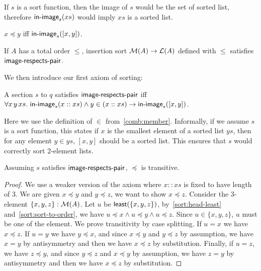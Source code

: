 If $s$ is a sort function, then the image of $s$ would be the set of sorted list, therefore
$\operatorname{\mathsf{in-image}}_s(xs)$ would imply $xs$ is a sorted list.

\begin{proposition}\label{sort:sort-to-order}
    $x \preccurlyeq y$ iff $\operatorname{\mathsf{in-image}}_s([x, y])$.
\end{proposition}

\begin{proposition}
    If $A$ has a total order $\leq$, insertion sort $\mathcal{M}(A) \to \mathcal{L}(A)$ defined with $\leq$
    satisfies $\operatorname{\mathsf{image-respects-pair}}$.
\end{proposition}

\noindent
We then introduce our first axiom of sorting:
\begin{definition}\label{sort:head-least}
    A section $s$ to $q$ satisfies $\operatorname{\mathsf{image-respects-pair}}$ iff
    $\forall x\, y\, xs.\, \operatorname{\mathsf{in-image}}_s(x :: xs) \land y \in (x :: xs) \to \operatorname{\mathsf{in-image}}_s([x,y])$.
\end{definition}
Here we use the definition of $\in$ from~\cref{comb:member}. Informally,
if we assume $s$ is a sort function, this states if
$x$ is the smallest element of a sorted list $ys$, then for any element $y \in ys$,
$[x, y]$ should be a sorted list. This ensures that $s$ would correctly sort 2-element lists.

\begin{proposition}
    Assuming $s$ satisfies $\operatorname{\mathsf{image-respects-pair}}$, $\preccurlyeq$ is transitive.
\end{proposition}
\begin{proof}
    We use a weaker version of the axiom where $x :: xs$ is fixed to have length of 3.
    We are given $x \preccurlyeq y$ and $y \preccurlyeq z$, we want to show $x \preccurlyeq z$.
    Consider the 3-element $\{x,y,z\} : \mathcal{M}(A)$. Let $u$ be $\operatorname{\mathsf{least}}(\{x,y,z\})$,
    by~\cref{sort:head-least} and~\cref{sort:sort-to-order},
    we have $u \preccurlyeq x \land u \preccurlyeq y \land u \preccurlyeq z$.
    Since $u \in \{x,y,z\}$, $u$ must be one of the element. We prove transitivity by case splitting.
    If $u = x$ we have $x \preccurlyeq z$. If $u = y$ we have $y \preccurlyeq x$, and since
    $x \preccurlyeq y$ and $y \preccurlyeq z$ by assumption,
    we have $x = y$ by antisymmetry and then we have $x \preccurlyeq z$ by substitution.
    Finally, if $u = z$, we have $z \preccurlyeq y$, and since
    $y \preccurlyeq z$ and $x \preccurlyeq y$ by assumption,
    we have $z = y$ by antisymmetry and then we have $x \preccurlyeq z$ by substitution.
\end{proof}

